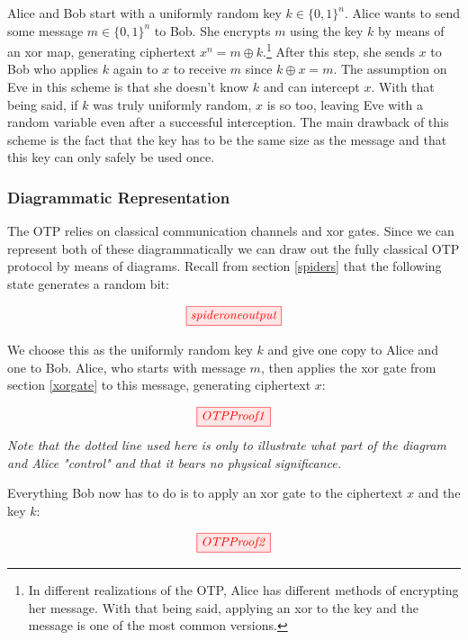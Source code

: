 \documentclass[]{article}
\begin{document}
Alice and Bob start with a uniformly random key $k \in \{0,1\}^n$. Alice wants to send some message $m \in \{0,1\}^n$ to Bob. She encrypts $m$ using the key $k$ by means of an xor map, generating ciphertext $x^n = m \oplus k$.\footnote{In different realizations of the OTP, Alice has different methods of encrypting her message. With that being said, applying an xor to the key and the message is one of the most common versions.} After this step, she sends $x$ to Bob who applies $k$ again to $x$ to receive $m$ since $k \oplus x = m$. The assumption on Eve in this scheme is that she doesn't know $k$ and can intercept $x$. With that being said, if $k$ was truly uniformly random, $x$ is so too, leaving Eve with a random variable even after a successful interception. The main drawback of this scheme is the fact that the key has to be the same size as the message and that this key can only safely be used once.

\subsubsection{Diagrammatic Representation}

The OTP relies on classical communication channels and xor gates. Since we can represent both of these diagrammatically we can draw out the fully classical OTP protocol by means of diagrams. Recall from section \ref{spiders} that the following state generates a random bit:

\begin{equation}
	\tikzfig{spideroneoutput}
\end{equation}

We choose this as the uniformly random key $k$ and give one copy to Alice and one to Bob. Alice, who starts with message $m$, then applies the xor gate from section \ref{xorgate} to this message, generating ciphertext $x$:

\begin{equation}
	\tikzfig{OTPProof1}
\end{equation}
\textit{Note that the dotted line used here is only to illustrate what part of the diagram and Alice "control" and that it bears no physical significance.}


Everything Bob now has to do is to apply an xor gate to the ciphertext $x$ and the key $k$:

\begin{equation}
\label{equation:OTPProof2}
\tikzfig{OTPProof2}
\end{equation}
\end{document}
